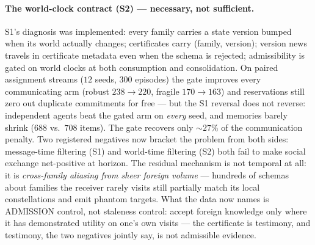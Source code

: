 \documentclass{article}
\begin{document}
\paragraph{The world-clock contract (S2) --- necessary, not
sufficient.} S1's diagnosis was implemented: every family carries a
state version bumped when its world actually changes; certificates
carry (family, version); version news travels in certificate metadata
even when the schema is rejected; admissibility is gated on world
clocks at both consumption and consolidation. On paired assignment
streams ($12$ seeds, $300$ episodes) the gate improves every
communicating arm (robust $238 \to 220$, fragile $170 \to 163$) and
reservations still zero out duplicate commitments for free --- but
the S1 reversal does not reverse: independent agents beat the gated
arm on \emph{every} seed, and memories barely shrink ($688$ vs.\
$708$ items). The gate recovers only ${\sim}27\%$ of the
communication penalty. Two registered negatives now bracket the
problem from both sides: message-time filtering (S1) and world-time
filtering (S2) both fail to make social exchange net-positive at
horizon. The residual mechanism is not temporal at all: it is
\emph{cross-family aliasing from sheer foreign volume} --- hundreds
of schemas about families the receiver rarely visits still partially
match its local constellations and emit phantom targets. What the
data now names is ADMISSION control, not staleness control: accept
foreign knowledge only where it has demonstrated utility on one's own
visits --- the certificate is testimony, and testimony, the two
negatives jointly say, is not admissible evidence.
\end{document}
